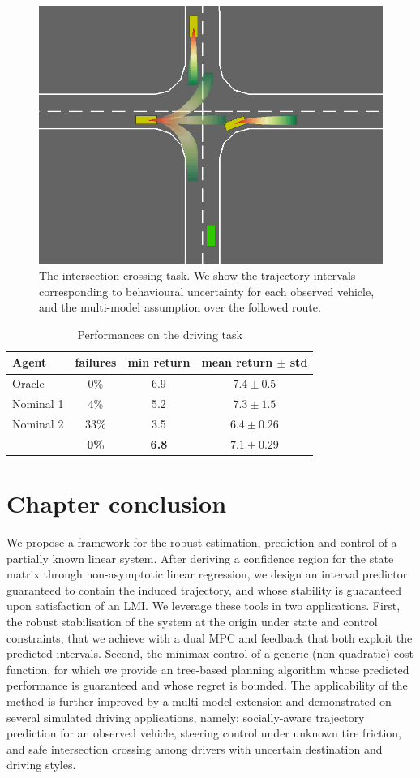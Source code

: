 \begin{figure}[t]
	\centering
	\includegraphics[width=0.7\linewidth]{img/highway-small}
	\caption{The intersection crossing task. We show the trajectory intervals corresponding to behavioural uncertainty for each observed vehicle, and the multi-model assumption over the followed route.}
\end{figure}

\begin{table}[t]
	\caption{Performances on the driving task}
	\label{tab:driving}
	\centering
	\begin{tabular}{lccc}
		\toprule
		Agent &
		failures &
		min return &
		mean return $\pm$ std  \\
		\midrule
		Oracle & 0\% & {6.9} & $7.4 \pm 0.5$ \\
		\midrule
		{Nominal 1} & 4\% & {5.2} & $\mathbf{7.3} \pm 1.5$ \\
		{Nominal 2} & 33\% & {3.5} & $6.4 \pm 0.26$ \\
		\Cref{alg:full} & \textbf{0\%} & \textbf{6.8} & $7.1 \pm 0.29$ \\
		\bottomrule
	\end{tabular}
\end{table}

\section*{Chapter conclusion}

We propose a framework for the robust estimation, prediction and control of a partially known linear system. After deriving a confidence region for the state matrix through non-asymptotic linear regression, we design an interval predictor guaranteed to contain the induced trajectory, and whose stability is guaranteed upon satisfaction of an \gls{LMI}. We leverage these tools in two applications. First, the robust stabilisation of the system at the origin under state and control constraints, that we achieve with a dual \gls{MPC} and feedback that both exploit the predicted intervals. Second, the minimax control of a generic (non-quadratic) cost function, for which we provide an tree-based planning algorithm whose predicted performance is guaranteed and whose regret is bounded. The applicability of the method is further improved by a multi-model extension and demonstrated on several simulated driving applications, namely: socially-aware trajectory prediction for an observed vehicle, steering control under unknown tire friction, and safe intersection crossing among drivers with uncertain destination and driving styles.

